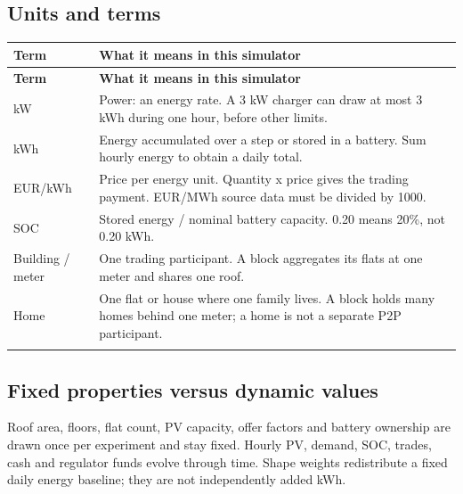 \documentclass[a4paper,11pt]{article}
\begin{document}
\subsection*{Units and terms}
\par\medskip

\begingroup\small
\begin{longtable}{>{\RaggedRight\arraybackslash}p{}>{\RaggedRight\arraybackslash}p{}}
\toprule
\textbf{Term} & \textbf{What it means in this simulator} \\ \midrule
\endfirsthead
\toprule
\textbf{Term} & \textbf{What it means in this simulator} \\ \midrule
\endhead
kW & Power: an energy rate. A 3 kW charger can draw at most 3 kWh during one hour, before other limits. \\ \addlinespace[3pt]
kWh & Energy accumulated over a step or stored in a battery. Sum hourly energy to obtain a daily total. \\ \addlinespace[3pt]
EUR/kWh & Price per energy unit. Quantity x price gives the trading payment. EUR/MWh source data must be divided by 1000. \\ \addlinespace[3pt]
SOC & Stored energy / nominal battery capacity. 0.20 means 20\%, not 0.20 kWh. \\ \addlinespace[3pt]
Building / meter & One trading participant. A block aggregates its flats at one meter and shares one roof. \\ \addlinespace[3pt]
Home & One flat or house where one family lives. A block holds many homes behind one meter; a home is not a separate P2P participant. \\ \addlinespace[3pt]
\bottomrule
\end{longtable}
\endgroup

\subsection*{Fixed properties versus dynamic values}
\par\medskip

Roof area, floors, flat count, PV capacity, offer factors and battery ownership are drawn once per experiment and stay fixed. Hourly PV, demand, SOC, trades, cash and regulator funds evolve through time. Shape weights redistribute a fixed daily energy baseline; they are not independently added kWh.
\par\medskip
\end{document}
